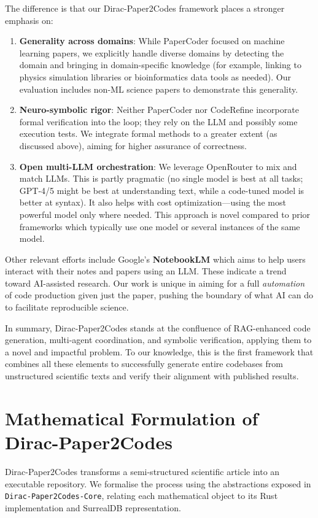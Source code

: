 \documentclass{ieeeaccess}
\begin{document}
The difference is that our Dirac-Paper2Codes framework places a stronger emphasis on:
\begin{enumerate}
\item \textbf{Generality across domains}: While PaperCoder focused on machine learning papers, we explicitly handle diverse domains by detecting the domain and bringing in domain-specific knowledge (for example, linking to physics simulation libraries or bioinformatics data tools as needed). Our evaluation includes non-ML science papers to demonstrate this generality.
\item \textbf{Neuro-symbolic rigor}: Neither PaperCoder nor CodeRefine incorporate formal verification into the loop; they rely on the LLM and possibly some execution tests. We integrate formal methods to a greater extent (as discussed above), aiming for higher assurance of correctness.
    \item \textbf{Open multi-LLM orchestration}: We leverage OpenRouter to mix and match LLMs. This is partly pragmatic (no single model is best at all tasks; GPT-4/5 might be best at understanding text, while a code-tuned model is better at syntax). It also helps with cost optimization---using the most powerful model only where needed. This approach is novel compared to prior frameworks which typically use one model or several instances of the same model.
\end{enumerate}

Other relevant efforts include Google's \textbf{NotebookLM} which aims to help users interact with their notes and papers using an LLM. These indicate a trend toward AI-assisted research. Our work is unique in aiming for a full \emph{automation} of code production given just the paper, pushing the boundary of what AI can do to facilitate reproducible science.

In summary, Dirac-Paper2Codes stands at the confluence of RAG-enhanced code generation, multi-agent coordination, and symbolic verification, applying them to a novel and impactful problem. To our knowledge, this is the first framework that combines all these elements to successfully generate entire codebases from unstructured scientific texts and verify their alignment with published results.

\section{Mathematical Formulation of Dirac-Paper2Codes}\label{sec:formal}
Dirac-Paper2Codes transforms a semi-structured scientific article into an executable repository. We formalise the process using the abstractions exposed in \texttt{Dirac-Paper2Codes-Core}, relating each mathematical object to its Rust implementation and SurrealDB representation.
\end{document}
